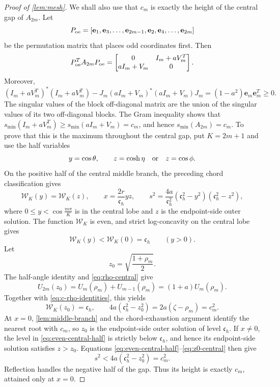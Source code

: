 \documentclass[review,hidelinks,onefignum,onetabnum]{siamart251216}
\begin{document}
\begin{proof}[Proof of \cref{lem:mesh}]
We shall also use that \(c_m\) is exactly the height of the central gap
of \(A_{2m}\).  Let
\[
 P_{\rm oe}=[\mathbf e_1,\mathbf e_3,\ldots,\mathbf e_{2m-1},
 \mathbf e_2,\mathbf e_4,\ldots,\mathbf e_{2m}]
\]
be the permutation matrix that places odd coordinates first.  Then
\[
 P_{\rm oe}^T A_{2m}P_{\rm oe}=
 \begin{bmatrix}0&I_m+aV_m^T\\aI_m+V_m&0\end{bmatrix}.
\]
Moreover,
\[
 (I_m+aV_m^T)^*(I_m+aV_m^T)
 -J_m(aI_m+V_m)^*(aI_m+V_m)J_m
 =(1-a^2)\mathbf e_m\mathbf e_m^T\geq0.
\]
The singular values of the block off-diagonal matrix are the union of
the singular values of its two off-diagonal blocks.  The Gram
inequality shows that
\(s_{\min}(I_m+aV_m^T)\geq s_{\min}(aI_m+V_m)=c_m\), and hence
\(s_{\min}(A_{2m})=c_m\).  To prove that this is the
maximum throughout the central gap, put \(K=2m+1\) and use the half
variables
\[
 y=\cos\theta,\qquad
 z=\cosh\eta\quad\hbox{or}\quad z=\cos\phi.
\]
On the positive half of the central middle branch, the preceding chord
classification gives
\begin{equation}\label{eq:even-central-half}
 \mathcal W_K(y)=\mathcal W_K(z),\qquad
 x=\frac{2r}{\mathfrak c_h}yz,\qquad
 s^2=\frac{4a}{\mathfrak c_h^2}
 (\mathfrak c_h^2-y^2)(\mathfrak c_h^2-z^2),
\end{equation}
where \(0\leq y<\cos\frac{m\pi}{K}\) is in the central lobe and
\(z\) is the
endpoint-side outer solution.  The function \(\mathcal W_K\) is even,
and strict log-concavity on the central lobe gives
\[
 \mathcal W_K(y)<\mathcal W_K(0)=\mathfrak c_h\qquad(y>0).
\]
Let
\[
 z_0=\sqrt{\frac{1+\rho_m}{2}}.
\]
The half-angle identity and \eqref{eq:rho-central} give
\[
 U_{2m}(z_0)=U_m(\rho_m)+U_{m-1}(\rho_m)
 =(1+a)U_m(\rho_m).
\]
Together with \eqref{eq:c-rho-identities}, this yields
\begin{equation}\label{eq:z0-central}
 \mathcal W_K(z_0)=\mathfrak c_h,\qquad
 4a(\mathfrak c_h^2-z_0^2)=2a(\zeta-\rho_m)=c_m^2.
\end{equation}
At \(x=0\), \cref{lem:middle-branch} and the chord-exhaustion argument
identify the nearest root with \(c_m\), so \(z_0\) is the endpoint-side
outer solution of level \(\mathfrak c_h\).  If \(x\neq0\), the level
in \eqref{eq:even-central-half} is strictly below \(\mathfrak c_h\), and hence its
endpoint-side solution satisfies \(z>z_0\).  Equations
\eqref{eq:even-central-half}--\eqref{eq:z0-central} then give
\[
 s^2<4a(\mathfrak c_h^2-z_0^2)=c_m^2.
\]
Reflection handles the negative half of the gap.  Thus its height is
exactly \(c_m\), attained only at \(x=0\).


\end{proof}
\end{document}
